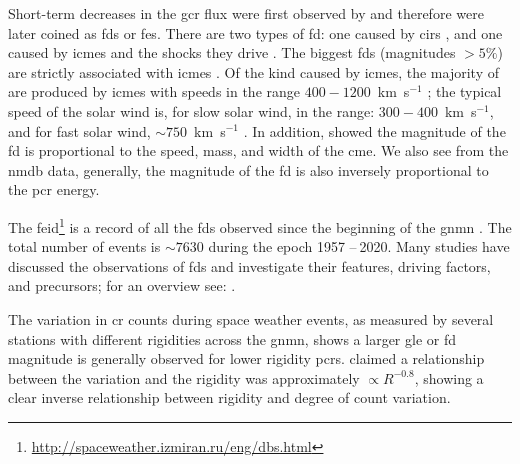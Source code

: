 Short-term decreases in the \gls{gcr} flux were first observed by \citet{forbush_effects_1937} and therefore were later coined as \glspl{fd} or \glspl{fe}. There are two types of \gls{fd}: one caused by \glspl{cir} \citep{dumbovic_forbush_2016}, and one caused by \glspl{icme} and the shocks they drive \citep{belov_forbush_2008}. The biggest \glspl{fd} (magnitudes $> 5\%$) are strictly associated with \glspl{icme} \citep{belov_what_2001}. Of the kind caused by \glspl{icme}, the majority of are produced by \glspl{icme} with speeds in the range $400 - 1200$~km~s$^{-1}$ \citep{lingri_forbush_2016}; the typical speed of the solar wind is, for slow solar wind, in the range: $300 - 400$~km~s$^{-1}$, and for fast solar wind, $\sim 750$~km~s$^{-1}$ \citep{owens_heliospheric_2013}. In addition, \citet{belov_what_2001, belov_coronal_2014} showed the magnitude of the \gls{fd} is proportional to the speed, mass, and width of the \gls{cme}. We also see from the \gls{nmdb} data, generally, the magnitude of the \gls{fd} is also inversely proportional to the \gls{pcr} energy.

The \gls{feid}\footnote{\url{http://spaceweather.izmiran.ru/eng/dbs.html}} is a record of all the \glspl{fd} observed since the beginning of the \gls{gnmn} \citep{belov_forbush_2008}. The total number of events is $\sim 7630$ during the epoch 1957 -- 2020. Many studies have discussed the observations of \glspl{fd} and investigate their features, driving factors, and precursors; for an overview see: \citet{belov_what_2001, usoskin_forbush_2008, wawrzynczak_modeling_2010, rockenbach_global_2014, arunbabu_how_2015}.

The variation in \gls{cr} counts during space weather events, as measured by several stations with different rigidities across the \gls{gnmn}, shows a larger \gls{gle} or \gls{fd} magnitude is generally observed for lower rigidity \glspl{pcr}. \citet{belov_solar_2005} claimed a relationship between the variation and the rigidity was approximately $\propto R^{-0.8}$, showing a clear inverse relationship between rigidity and degree of count variation.

